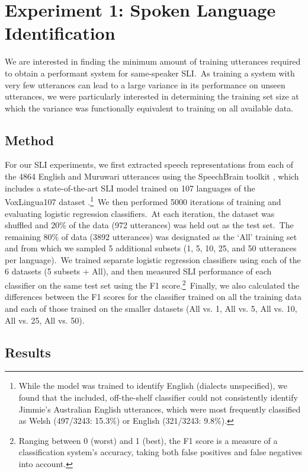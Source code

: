 \documentclass[main.tex]{subfiles}
\begin{document}
\section{Experiment 1: Spoken Language Identification}

We are interested in finding the minimum amount of training utterances required to obtain a performant system for same-speaker SLI.~As training a system with very few utterances can lead to a large variance in its performance on unseen utterances, we were particularly interested in determining the training set size at which the variance was functionally equivalent to training on all available data.

\subsection{Method}

For our SLI experiments, we first extracted speech representations from each of the 4864 English and Muruwari utterances using the SpeechBrain toolkit \parencite{ravanelli2021speechbrain}, which includes a state-of-the-art SLI model trained on 107 languages of the VoxLingua107 dataset \parencite{valk2021voxlingua107}.\footnote{While the model was trained to identify English (dialects unspecified), we found that the included, off-the-shelf classifier could not consistently identify Jimmie’s Australian English utterances, which were most frequently classified as Welsh (497/3243: 15.3\%) or English (321/3243: 9.8\%).}~We then performed 5000 iterations of training and evaluating logistic regression classifiers.~At each iteration, the dataset was shuffled and 20\% of the data (972 utterances) was held out as the test set.~The remaining 80\% of data (3892 utterances) was designated as the `All' training set and from which we sampled 5 additional subsets (1, 5, 10, 25, and 50 utterances per language).~We trained separate logistic regression classifiers using each of the 6 datasets (5 subsets + All), and then measured SLI performance of each classifier on the same test set using the F1 score.\footnote{Ranging between 0 (worst) and 1 (best), the F1 score is a measure of a classification system’s accuracy, taking both false positives and false negatives into account.}~Finally, we also calculated the differences between the F1 scores for the classifier trained on all the training data and each of those trained on the smaller datasets (All vs. 1, All vs. 5, All vs. 10, All vs. 25, All vs. 50).

\subsection{Results}
\end{document}
